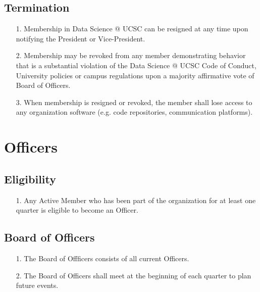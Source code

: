 \documentclass{article}
\begin{document}
\subsection{Termination}
\begin{itemize}
    \item[1.] Membership in Data Science @ UCSC can be resigned at any time upon notifying the 
    President or Vice-President.
    \item[2.] Membership may be revoked from any member demonstrating behavior that is a 
    substantial  violation of the Data Science @ UCSC Code of Conduct, University policies or campus 
    regulations upon a majority affirmative vote of Board of Officers. 
    \item[3.] When membership is resigned or revoked, the member shall lose
    access to any organization software (e.g. code repositories, communication platforms).    
\end{itemize}


\section{Officers}

\subsection{Eligibility}
\begin{itemize}
    \item[1.] Any Active Member who has been part of the organization
    for at least one quarter is eligible to become an Officer.
\end{itemize}

\subsection{Board of Officers}
\begin{itemize}
    \item[1.] The Board of Offficers consists of all current Officers.
    \item[2.] The Board of Officers shall meet at the beginning of each quarter to plan 
    future events. 
\end{itemize}
\end{document}
